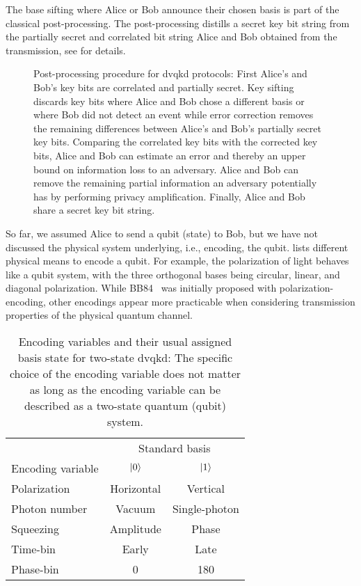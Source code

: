 The base sifting where Alice or Bob announce their chosen basis is part of the classical post-processing.
The post-processing distills a secret key bit string from the partially secret and correlated bit string Alice and Bob obtained from the transmission, see  for details.
\begin{figure}[htb]
	\centering
	
	\caption{Post-processing procedure for \gls{dvqkd} protocols: First Alice's and Bob's key bits are correlated and partially secret. Key sifting discards key bits where Alice and Bob chose a different basis or where Bob did not detect an event while error correction removes the remaining differences between Alice's and Bob's partially secret key bits. Comparing the correlated key bits with the corrected key bits, Alice and Bob can estimate an error and thereby an upper bound on information loss to an adversary. Alice and Bob can remove the remaining partial information an adversary potentially has by performing privacy amplification. Finally, Alice and Bob share a secret key bit string.}\label{fig:dvqkd_post_processing}
\end{figure}

So far, we assumed Alice to send a qubit (state) to Bob, but we have not discussed the physical system underlying, i.e., encoding, the qubit.
 lists different physical means to encode a qubit.
For example, the polarization of light behaves like a qubit system, with the three orthogonal bases being circular, linear, and diagonal polarization.
While BB84~\cite{Bennett1984} was initially proposed with polarization-encoding, other encodings appear more practicable when considering transmission properties of the physical quantum channel.
\begin{table}[htb]
	\centering	
	\begin{tabular}{lcc}
		\toprule
		& \multicolumn{2}{c}{Standard basis} \\
		\cmidrule{2-3}
		Encoding variable & $\ket{0}$ & $\ket{1}$ \\
		\midrule
		Polarization & Horizontal & Vertical \\
		Photon number & Vacuum & Single-photon \\
		Squeezing & Amplitude & Phase \\
		Time-bin & Early & Late \\
		Phase-bin & \SI{0}{\deg} & \SI{180}{\deg} \\
		\bottomrule
	\end{tabular}
	\caption{Encoding variables and their usual assigned basis state for two-state \gls{dvqkd}: The specific choice of the encoding variable does not matter as long as the encoding variable can be described as a two-state quantum (qubit) system.}\label{tab:dvqkd_encodings}
\end{table}

